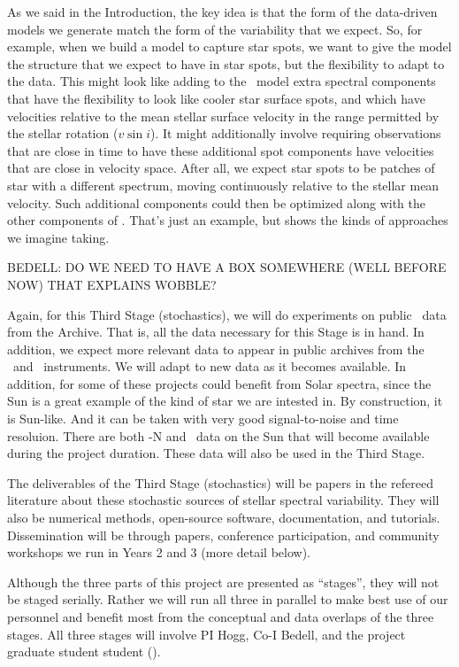 \documentclass[12pt, letterpaper]{article}
\begin{document}
As we said in the Introduction, the key idea is that the form of the
data-driven models we generate match the form of the variability that
we expect.
So, for example, when we build a model to capture star spots, we want
to give the model the structure that we expect to have in star spots,
but the flexibility to adapt to the data.
This might look like adding to the \wobble\ model extra spectral
components that have the flexibility to look like cooler star surface
spots, and which have velocities relative to the mean stellar surface
velocity in the range permitted by the stellar rotation ($v\sin i$).
It might additionally involve requiring observations that are close
in time to have these additional spot components have velocities that
are close in velocity space.
After all, we expect star spots to be patches of star with a different
spectrum, moving continuously relative to the stellar mean velocity.
Such additional components could then be optimized along with the other
components of \wobble.
That's just an example, but shows the kinds of approaches we imagine taking.

BEDELL: DO WE NEED TO HAVE A BOX SOMEWHERE (WELL BEFORE NOW) THAT EXPLAINS WOBBLE?

Again, for this Third Stage (stochastics), we will do experiments on
public \HARPS\ data from the Archive.
That is, all the data necessary for this Stage is in hand.
In addition, we expect more relevant data to appear in public archives
from the \ESPRESSO\ and \NEID\ instruments.
We will adapt to new data as it becomes available.
In addition, for some of these projects could benefit from Solar
spectra, since the Sun is a great example of the kind of star we are
intested in.
By construction, it is Sun-like.
And it can be taken with very good signal-to-noise and time resoluion.
There are both \HARPS-N and \HARPS\ data on the Sun that will become
available during the project duration.
These data will also be used in the Third Stage.

The deliverables of the Third Stage (stochastics) will be papers in the
refereed literature about these stochastic sources of stellar spectral
variability.
They will also be numerical methods, open-source software, documentation,
and tutorials.
Dissemination will be through papers, conference participation, and
community workshops we run in Years 2 and 3 (more detail below).


Although the three parts of this project are presented as ``stages'',
they will not be staged serially.
Rather we will run all three in parallel to make best use of our
personnel and benefit most from the conceptual and data overlaps of the three stages.
All three stages will involve PI Hogg, Co-I Bedell, and the project
graduate student student (\GRA). 
\end{document}
